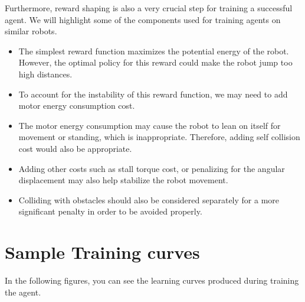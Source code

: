 \documentclass{article}
\begin{document}
Furthermore, reward shaping is also a very crucial step for training a successful agent. We will highlight some of the components used for training agents on similar robots.
\begin{itemize}
	\item The simplest reward function maximizes the potential energy of the robot. However, the optimal policy for this reward could make the robot jump too high distances.
	\item To account for the instability of this reward function, we may need to add motor energy consumption cost.
	\item The motor energy consumption may cause the robot to lean on itself for movement or standing, which is inappropriate. Therefore, adding self collision cost would also be appropriate.
	\item Adding other costs such as stall torque cost, or penalizing for the angular displacement may also help stabilize the robot movement.
	\item Colliding with obstacles should also be considered separately for a more significant penalty in order to be avoided properly.
\end{itemize}

\section{Sample Training curves}

In the following figures, you can see the learning curves produced during training the agent.
\end{document}
